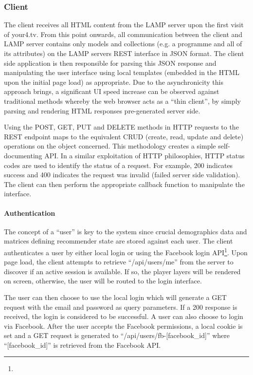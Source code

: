 \subsubsection{Client}

The client receives all HTML content from the LAMP server upon the first visit of your4.tv. From this point onwards, all communication between the client and LAMP server contains only models and collections (e.g. a programme and all of its attributes) on the LAMP servers REST interface in JSON format. The client side application is then responsible for parsing this JSON response and manipulating the user interface using local templates (embedded in the HTML upon the initial page load) as appropriate. Due to the asynchronicity this approach brings, a significant UI speed increase can be observed against traditional methods whereby the web browser acts as a ``thin client'', by simply parsing and rendering HTML responses pre-generated server side.

Using the POST, GET, PUT and DELETE methods in HTTP requests to the REST endpoint maps to the equivalent CRUD (create, read, update and delete) operations on the object concerned. This methodology creates a simple self-documenting API. In a similar exploitation of HTTP philosophies, HTTP status codes are used to identify the status of a request. For example, 200 indicates success and 400 indicates the request was invalid (failed server side validation). The client can then perform the appropriate callback function to manipulate the interface.

\paragraph{Authentication}

The concept of a ``user'' is key to the system since crucial demographics data and matrices defining recommender state are stored against each user. The client authenticates a user by either local login or using the Facebook login API\footnote{}. Upon page load, the client attempts to retrieve ``/api/users/me'' from the server to discover if an active session is available. If so, the player layers will be rendered on screen, otherwise, the user will be routed to the login interface.

The user can then choose to use the local login which will generate a GET request with the email and password as query parameters. If a 200 response is received, the login is considered to be successful. A user can also choose to login via Facebook. After the user accepts the Facebook permissions, a local cookie is set and a GET request is generated to ``/api/users/fb-[facebook\_id]'' where ``[facebook\_id]'' is retrieved from the Facebook API.


